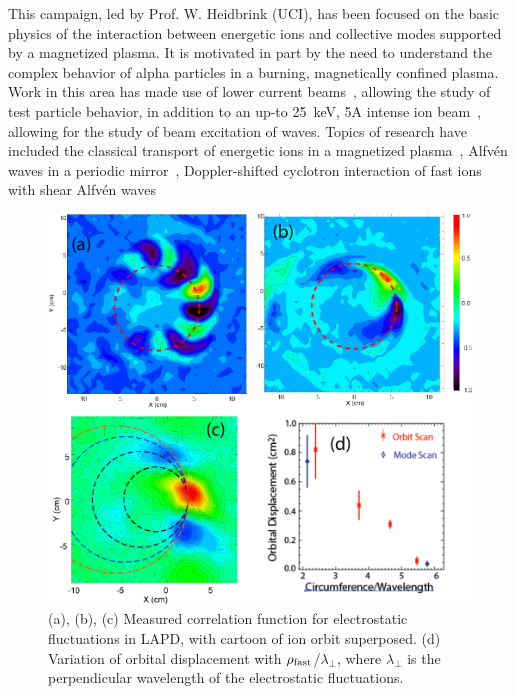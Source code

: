 \documentclass[11pt]{article}
\renewcommand{\cite}{\citep}
\begin{document}
This campaign, led by Prof. W. Heidbrink (UCI), has been focused on the basic
physics of the interaction between energetic ions and collective modes
supported by a magnetized plasma. It is motivated in part by the need to
understand the complex behavior of alpha particles in a burning,
magnetically confined plasma.  Work in this area has made use of lower
current beams~\cite{zhang:2007}, allowing the study of test particle behavior, in
addition to an up-to 25~keV, 5A intense ion beam~\cite{tripathi:2011}, allowing for the
study of beam excitation of waves.    Topics of research have included
the classical transport of energetic ions in a magnetized
plasma~\cite{zhao:2005}, Alfv\'en waves in a periodic
mirror~\cite{zhang:2008a}, Doppler-shifted cyclotron interaction of
fast ions with shear Alfv\'{e}n waves~\cite{zhang:2008b,zhang:2009}

\begin{figure}
\begin{center}
\includegraphics[width=3.5truein]{fastion}
\caption{(a), (b), (c) Measured correlation function for electrostatic
  fluctuations in LAPD, with cartoon of ion orbit superposed. (d)
  Variation of orbital displacement with $\rho_{\rm
    fast}$/$\lambda_{\perp}$, where $\lambda_\perp$ is the
  perpendicular wavelength of the electrostatic fluctuations. }\label{fastion}
\end{center}
\end{figure}
\end{document}
